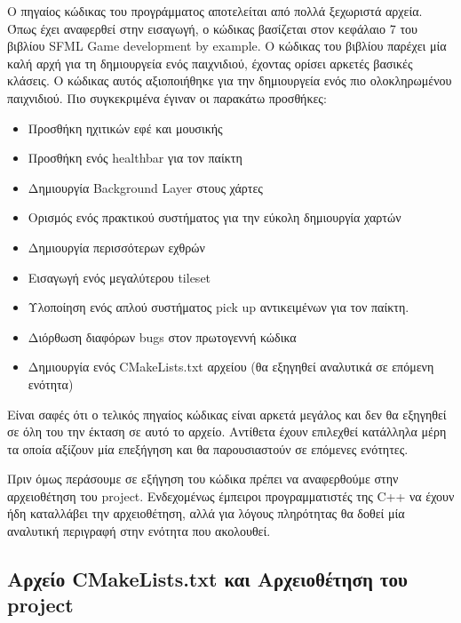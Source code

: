 \documentclass[12pt]{article}
\begin{document}
	Ο πηγαίος κώδικας του προγράμματος αποτελείται από πολλά ξεχωριστά αρχεία. Όπως έχει αναφερθεί στην εισαγωγή, ο κώδικας βασίζεται στον κεφάλαιο 7 του βιβλίου SFML Game development by example. Ο κώδικας του βιβλίου παρέχει μία καλή αρχή για τη δημιουργεία ενός παιχνιδιού, έχοντας ορίσει αρκετές βασικές κλάσεις. Ο κώδικας αυτός αξιοποιήθηκε για την δημιουργεία ενός πιο ολοκληρωμένου παιχνιδιού. Πιο συγκεκριμένα έγιναν οι παρακάτω προσθήκες:
	
	\begin{itemize}
		\item Προσθήκη ηχιτικών εφέ και μουσικής
		
		\item Προσθήκη ενός healthbar για τον παίκτη
		
		\item Δημιουργία Background Layer στους χάρτες
		
		\item Ορισμός ενός πρακτικού συστήματος για την εύκολη δημιουργία χαρτών
		
		\item Δημιουργία περισσότερων εχθρών
		
		\item Εισαγωγή ενός μεγαλύτερου tileset
		
		\item Υλοποίηση ενός απλού συστήματος pick up αντικειμένων για τον παίκτη.
		
		\item Διόρθωση διαφόρων bugs στον πρωτογεννή κώδικα
		
		\item Δημιουργία ενός CMakeLists.txt αρχείου (θα εξηγηθεί αναλυτικά σε επόμενη ενότητα)
	\end{itemize}

	Είναι σαφές ότι ο τελικός πηγαίος κώδικας είναι αρκετά μεγάλος και δεν θα εξηγηθεί σε όλη του την έκταση σε αυτό το αρχείο. Αντίθετα έχουν επιλεχθεί κατάλληλα μέρη τα οποία αξίζουν μία επεξήγηση και θα παρουσιαστούν σε επόμενες ενότητες.
	
	Πριν όμως περάσουμε σε εξήγηση του κώδικα πρέπει να αναφερθούμε στην αρχειοθέτηση του project. Ενδεχομένως έμπειροι προγραμματιστές της C++ να έχουν ήδη καταλλάβει την αρχειοθέτηση, αλλά για λόγους πληρότητας θα δοθεί μία αναλυτική περιγραφή στην ενότητα που ακολουθεί.
	
	\subsection{Αρχείο CMakeLists.txt και Αρχειοθέτηση του project}
	
\end{document}
